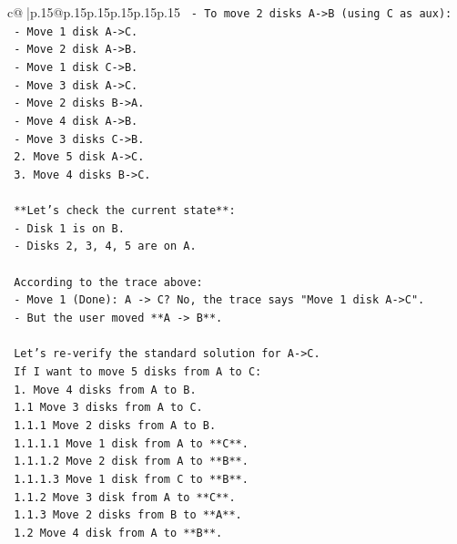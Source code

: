 \documentclass{article}
\begin{document}
{\begin{supertabular}{c@{$\;$}|p{.15\linewidth}@{}p{.15\linewidth}p{.15\linewidth}p{.15\linewidth}p{.15\linewidth}p{.15\linewidth}}
{{{\texttt{               {-} To move 2 disks A{-}>B (using C as aux):} \\
\texttt{                 {-} Move 1 disk A{-}>C.} \\
\texttt{                 {-} Move 2 disk A{-}>B.} \\
\texttt{                 {-} Move 1 disk C{-}>B.} \\
\texttt{             {-} Move 3 disk A{-}>C.} \\
\texttt{             {-} Move 2 disks B{-}>A.} \\
\texttt{         {-} Move 4 disk A{-}>B.} \\
\texttt{         {-} Move 3 disks C{-}>B.} \\
\texttt{    2. Move 5 disk A{-}>C.} \\
\texttt{    3. Move 4 disks B{-}>C.} \\
\\ 
\texttt{    **Let's check the current state**:} \\
\texttt{    {-} Disk 1 is on B.} \\
\texttt{    {-} Disks 2, 3, 4, 5 are on A.} \\
\\ 
\texttt{    According to the trace above:} \\
\texttt{    {-} Move 1 (Done): A {-}> C? No, the trace says "Move 1 disk A{-}>C".} \\
\texttt{    {-} But the user moved **A {-}> B**.} \\
\\ 
\texttt{    Let's re{-}verify the standard solution for A{-}>C.} \\
\texttt{    If I want to move 5 disks from A to C:} \\
\texttt{    1. Move 4 disks from A to B.} \\
\texttt{       1.1 Move 3 disks from A to C.} \\
\texttt{           1.1.1 Move 2 disks from A to B.} \\
\texttt{               1.1.1.1 Move 1 disk from A to **C**.} \\
\texttt{               1.1.1.2 Move 2 disk from A to **B**.} \\
\texttt{               1.1.1.3 Move 1 disk from C to **B**.} \\
\texttt{           1.1.2 Move 3 disk from A to **C**.} \\
\texttt{           1.1.3 Move 2 disks from B to **A**.} \\
\texttt{       1.2 Move 4 disk from A to **B**.} \\
}}}
\end{supertabular}}
\end{document}
